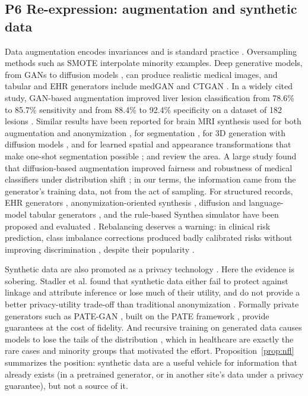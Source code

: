 \documentclass[acmsmall,screen,review]{acmart}
\theoremstyle{acmdefinition}
\begin{document}
\subsection{P6 Re-expression: augmentation and synthetic data}\label{sec:S6_6}

 Data augmentation encodes invariances and is standard practice \cite{shorten2019survey,zhang2018mixup}. Oversampling methods such as SMOTE \cite{chawla2002smote} interpolate minority  examples. Deep generative models, from GANs \cite{goodfellow2014generative} to diffusion models \cite{ho2020denoising,kazerouni2023diffusion}, can produce realistic medical images, and tabular and EHR generators include medGAN \cite{choi2017generating} and CTGAN \cite{xu2019modeling}. In a widely cited study, GAN-based augmentation improved liver lesion classification from 78.6\% to 85.7\% sensitivity and from 88.4\% to 92.4\% specificity on a dataset of 182 lesions \cite{fridadar2018gan}. Similar results have been reported for brain MRI synthesis used for both augmentation and anonymization \cite{shin2018medical}, for segmentation \cite{bowles2018gan}, for 3D generation with diffusion models \cite{khader2023denoising}, and for learned spatial and appearance transformations that make one-shot segmentation possible \cite{chaitanya2021semi,zhao2019data}; \citet{yi2019generative} and \citet{chlap2021review} review the area. A large study found that diffusion-based augmentation improved fairness and robustness of medical classifiers under distribution shift \cite{ktena2024generative}; in our terms, the information came from the generator’s training data, not from the act of sampling. For structured records, EHR generators \cite{baowaly2019synthesizing,zhang2020ensuring}, anonymization-oriented synthesis \cite{beaulieujones2019privacy,yoon2020anonymization}, diffusion and language-model tabular generators \cite{borisov2023language,kotelnikov2023tabddpm}, and the rule-based Synthea simulator \cite{walonoski2018synthea} have been proposed and evaluated \cite{goncalves2020generation}. Rebalancing deserves a warning: in clinical risk prediction, class imbalance corrections produced badly calibrated risks without improving discrimination \cite{goorbergh2022harm}, despite their popularity \cite{fernandez2018smote}.

Synthetic data are also promoted as a privacy technology \cite{chen2021synthetic,jordon2022synthetic}. Here the evidence is sobering. Stadler et al. found that synthetic data either fail to protect against linkage and attribute inference or lose much of their utility, and do not provide a better privacy-utility trade-off than traditional anonymization \cite{stadler2022synthetic}. Formally private generators such as PATE-GAN \cite{jordon2019pate}, built on the PATE framework \cite{papernot2017semi}, provide guarantees at the cost of fidelity. And recursive training on generated data causes models to lose the tails of the distribution \cite{shumailov2024ai}, which in healthcare are exactly the rare cases and minority groups that motivated the effort. Proposition~\ref{prop:nfl} summarizes the position: synthetic data are a useful vehicle for information that already exists (in a pretrained generator, or in another site’s data under a privacy guarantee), but not a source of it.
\end{document}
